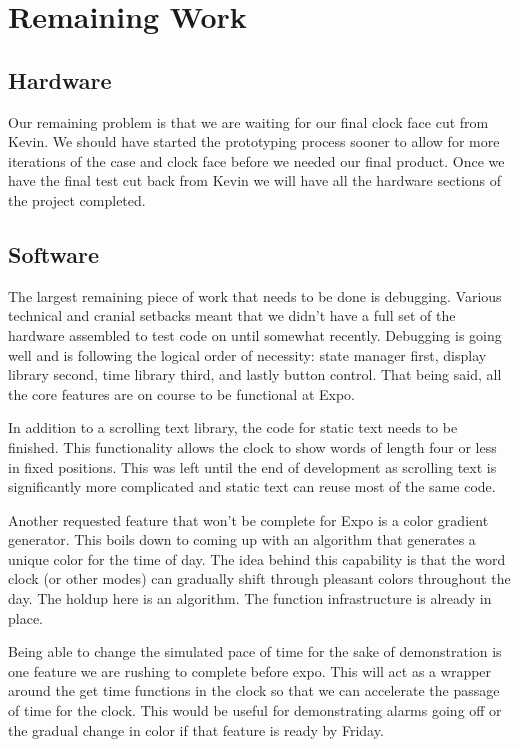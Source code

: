 \documentclass[onecolumn, draftclsnofoot,10pt, compsoc]{IEEEtran}
\begin{document}
\section{Remaining Work}
\subsection{Hardware}
Our remaining problem is that we are waiting for our final clock face cut from Kevin.
We should have started the prototyping process sooner to allow for more iterations of the case and clock face before we needed our final product.
Once we have the final test cut back from Kevin we will have all the hardware sections of the project completed.

\subsection{Software}
The largest remaining piece of work that needs to be done is debugging.
Various technical and cranial setbacks meant that we didn’t have a full set of the hardware assembled to test code on until somewhat recently.
Debugging is going well and is following the logical order of necessity: state manager first, display library second, time library third, and lastly button control.
That being said, all the core features are on course to be functional at Expo.

In addition to a scrolling text library, the code for static text needs to be finished.
This functionality allows the clock to show words of length four or less in fixed positions.
This was left until the end of development as scrolling text is significantly more complicated and static text can reuse most of the same code.

Another requested feature that won’t be complete for Expo is a color gradient generator.
This boils down to coming up with an algorithm that generates a unique color for the time of day.
The idea behind this capability is that the word clock (or other modes) can gradually shift through pleasant colors throughout the day.
The holdup here is an algorithm.
The function infrastructure is already in place.

Being able to change the simulated pace of time for the sake of demonstration is one feature we are rushing to complete before expo.
This will act as a wrapper around the get time functions in the clock so that we can accelerate the passage of time for the clock.
This would be useful for demonstrating alarms going off or the gradual change in color if that feature is ready by Friday.
\end{document}
